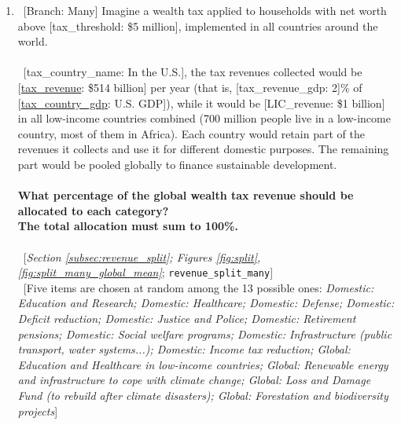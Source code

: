 \begin{enumerate}[resume]
\item ~[Branch: Many] \label{q:revenue_split_many} Imagine a wealth tax applied to households with net worth above [tax\_threshold: \$5 million], implemented in all countries around the world.
~\\\\ 
~[tax\_country\_name: In the U.S.], the tax revenues collected would be [\hyperlink{tab_features}{tax\_revenue}: \$514 billion] per year (that is, [tax\_revenue\_gdp: 2]\% of [\hyperlink{tab_features}{tax\_country\_gdp}: U.S. GDP]), while it would be [LIC\_revenue: \$1 billion] in all low-income countries combined (700 million people live in a low-income country, most of them in Africa).
Each country would retain part of the revenues it collects and use it for different domestic purposes. The remaining part would be pooled globally to finance sustainable development.
~\\\\\textbf{What percentage of the global wealth tax revenue should be allocated to each category?}~\\\textbf{The total allocation must sum to
100\%.}\\\\ 
~[\textit{Section \ref{subsec:revenue_split}; Figures \ref{fig:split}, %
\ref{fig:split_many_global_mean}}; 
\verb|revenue_split_many|]
  \\ ~[Five items are chosen at random among the 13 possible ones: \textit{Domestic: Education and Research; Domestic: Healthcare; Domestic: Defense; Domestic: Deficit reduction; Domestic: Justice and Police; Domestic: Retirement pensions; Domestic: Social welfare programs; Domestic: Infrastructure (public transport, water systems...); Domestic: Income tax reduction; Global: Education and Healthcare in low-income countries; Global: Renewable energy and infrastructure to cope with climate change; Global: Loss and Damage Fund (to rebuild after climate disasters); Global: Forestation and biodiversity projects}]


\end{enumerate} 

